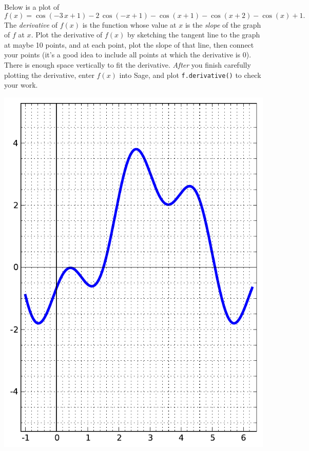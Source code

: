 Below is a plot of $$f(x)=\cos\left(-3 \, x + 1\right) - 2 \, \cos\left(-x + 1\right) - \cos\left(x + 1\right) - \cos\left(x + 2\right) - \cos\left(x\right) + 1.$$  The {\em \color{red}derivative} of $f(x)$ is the function whose value at $x$ is the {\em slope} of the graph of $f$ at $x$.  Plot the derivative of $f(x)$ by sketching the tangent line to the graph at maybe 10 points, and at each point, plot the slope of that line, then connect your points (it's a good idea to include all points at which the derivative is 0).  There is enough space vertically to fit the derivative.  {\em After} you finish carefully plotting the derivative, enter $f(x)$ into Sage, and plot {\color{blue}\verb|f.derivative()|} to check your work.
\begin{center}\includegraphics{functions/54.pdf}\end{center}\newpage

